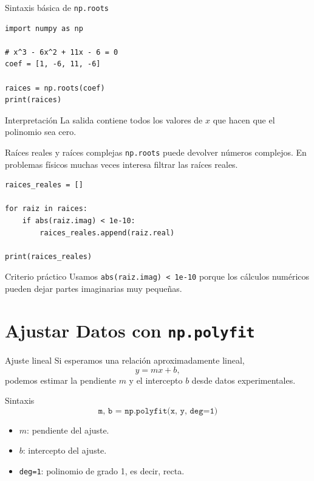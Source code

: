 \documentclass[10pt]{beamer}
\begin{document}
\begin{frame}[fragile]{Sintaxis básica de \texttt{np.roots}}
\begin{verbatim}
import numpy as np

# x^3 - 6x^2 + 11x - 6 = 0
coef = [1, -6, 11, -6]

raices = np.roots(coef)
print(raices)
\end{verbatim}

  \begin{block}{Interpretación}
    La salida contiene todos los valores de \(x\) que hacen que el polinomio sea cero.
  \end{block}
\end{frame}

\begin{frame}[fragile]{Raíces reales y raíces complejas}
  \texttt{np.roots} puede devolver números complejos. En problemas físicos muchas veces interesa filtrar las raíces reales.

\begin{verbatim}
raices_reales = []

for raiz in raices:
    if abs(raiz.imag) < 1e-10:
        raices_reales.append(raiz.real)

print(raices_reales)
\end{verbatim}

  \begin{alertblock}{Criterio práctico}
    Usamos \texttt{abs(raiz.imag) < 1e-10} porque los cálculos numéricos pueden dejar partes imaginarias muy pequeñas.
  \end{alertblock}
\end{frame}

\section{Ajustar Datos con \texttt{np.polyfit}}

\begin{frame}{Ajuste lineal}
  Si esperamos una relación aproximadamente lineal,
  \[
    y = mx + b,
  \]
  podemos estimar la pendiente \(m\) y el intercepto \(b\) desde datos experimentales.

  \begin{block}{Sintaxis}
    \[
      \texttt{m, b = np.polyfit(x, y, deg=1)}
    \]
  \end{block}

  \begin{itemize}
    \item \(m\): pendiente del ajuste.
    \item \(b\): intercepto del ajuste.
    \item \texttt{deg=1}: polinomio de grado 1, es decir, recta.
  \end{itemize}
\end{frame}
\end{document}
